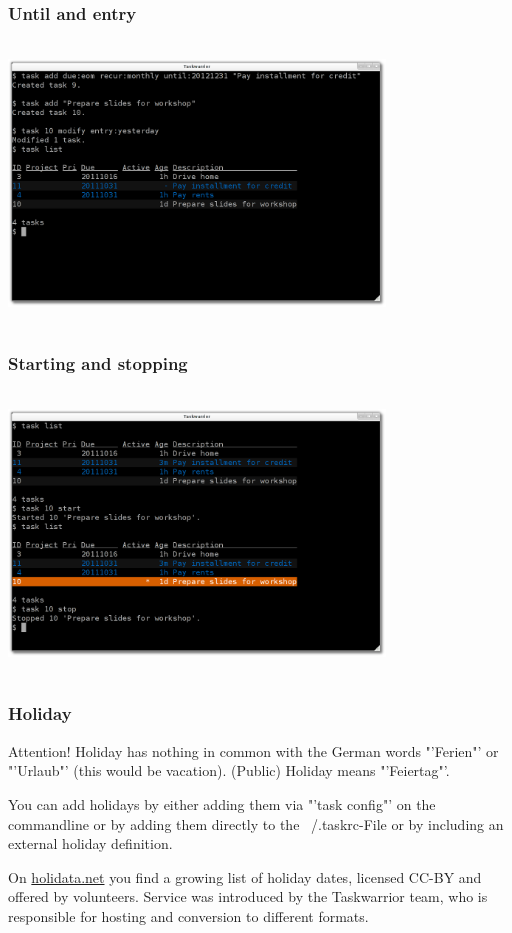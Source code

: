 \documentclass[t,handout]{beamer}
\begin{document}
\begin{frame}
\frametitle{Until and entry}
\begin{center}
\includegraphics[width=10cm,height=7.5cm]{until_and_entry.png}
\end{center}
\end{frame}

\begin{frame}
\frametitle{Starting and stopping}
\begin{center}
\includegraphics[width=10cm,height=7.5cm]{starting_and_stopping.png}
\end{center}
\end{frame}

\begin{frame}
\frametitle{Holiday}
\begin{alertblock}{Attention!}
Holiday has nothing in common with the German words "'Ferien"' or "'Urlaub"' (this would be vacation). (Public) Holiday means "'Feiertag"'.
\end{alertblock}

You can add holidays by either adding them via "'task config"' on the commandline or by adding them directly to the ~/.taskrc-File or by including an external holiday definition.

On \href{http://holidata.net/}{holidata.net} you find a growing list of holiday dates, licensed CC-BY and offered by volunteers. Service was introduced by the Taskwarrior team, who is responsible for hosting and conversion to different formats.
\end{frame}
\end{document}
